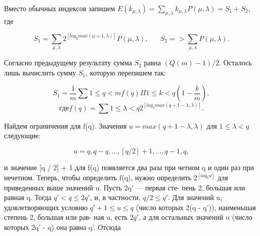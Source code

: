 \begin{myproof}
 Вместо обычных индексов запишем $E(k_{\mu, \lambda}) = \sum_{\mu, \lambda} k_{\mu, \lambda}P(\mu, \lambda) = S_{1} + S_{2}$, \linebreak \indent где \par
 
 $$S_{1} = \sum_{\mu, \lambda} 2^{[log_{2} max(\mu + 1,\lambda)]} P(\mu, \lambda), \;\;\;\;\;\; S_{2} = >\sum_{\mu, \lambda}P(\mu, \lambda).$$ \par 
 
 Согласно предыдущему результату сумма $S_{2}$ равна $(Q(m) - 1)/2$. \linebreak \indent Осталось лишь вычислить сумму $S_{1}$, которую перепишем так: \linebreak \newpage 
 

$$S_{1} = \frac{1}{m} \sum{1 \leqslant q < m} f(q) \Pi {1 \leqslant k < q} (1 - \frac{k}{m}),$$ \linebreak 
$$где f(q) = \sum{1 \leqslant \lambda < q} 2^{[log_{2}max(q+1-\lambda,\lambda)]}.$$ \par 

\noindent Найдем ограничения для f(q). Значения $u = max(q + 1 - \lambda, \lambda)$ для \linebreak \noindent $1 \leqslant \lambda < q$ следующие: \par

$$u = q, q - q, ...,[q/2] + 1, ..., q - 1, q,$$ \par

\indent и значение [q / 2] + 1 для f(q) появляется два раза при четном q и один раз \linebreak \indent при нечетном. Теперь, чтобы определить f(q), нужно определить \linebreak \indent $2^{[log_{2}u]}$ для приведенных выше значений u. Пусть 2q' --- первая сте- \linebreak \indent пень 2, большая или равная q. Тогда $q' < q \leqslant 2q'$, и, в частности, \linebreak \indent $q/2 \leqslant q'$. Для значений u, удовлетворяющих условию $q' + 1 \leqslant u \leqslant q$ \linebreak \indent (число которых 2(q - q')), наименьшая степень 2, большая или рав- \linebreak \indent  ная u, есть $2q'$, а для остальных значений u (число которых 2q' - q) \linebreak \indent она равна q'. Отсюда \par 


\end{myproof}
